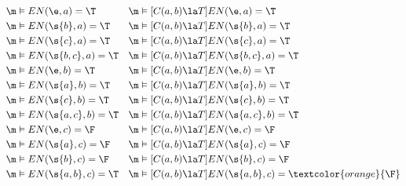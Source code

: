 \begin{frame}
    \begin{align*}
        \m & \vDash EN(\e,a)       = \T              &
        \m & \vDash[C(a,b)\la T] EN(\e,a)       = \T   \\
        \m & \vDash EN(\s{b},a)    = \T              &
        \m & \vDash[C(a,b)\la T] EN(\s{b},a)    = \T   \\
        \m & \vDash EN(\s{c},a)    = \T              &
        \m & \vDash[C(a,b)\la T] EN(\s{c},a)    = \T   \\
        \m & \vDash EN(\s{b,c},a)  = \T              &
        \m & \vDash[C(a,b)\la T] EN(\s{b,c},a)  = \T   \\
        \m & \vDash EN(\e,b)       = \T              &
        \m & \vDash[C(a,b)\la T] EN(\e,b)       = \T   \\
        \m & \vDash EN(\s{a},b)    = \T              &
        \m & \vDash[C(a,b)\la T] EN(\s{a},b)    = \T   \\
        \m & \vDash EN(\s{c},b)    = \T              &
        \m & \vDash[C(a,b)\la T] EN(\s{c},b)    = \T   \\
        \m & \vDash EN(\s{a,c},b)  = \T              &
        \m & \vDash[C(a,b)\la T] EN(\s{a,c},b)  = \T   \\
        \m & \vDash EN(\e,c)       = \F              &
        \m & \vDash[C(a,b)\la T] EN(\e,c)       = \F   \\
        \m & \vDash EN(\s{a},c)    = \F              &
        \m & \vDash[C(a,b)\la T] EN(\s{a},c)    = \F   \\
        \m & \vDash EN(\s{b},c)    = \F              &
        \m & \vDash[C(a,b)\la T] EN(\s{b},c)    = \F   \\
        \m & \vDash EN(\s{a,b},c)  = \T              &
        \m & \vDash[C(a,b)\la T] EN(\s{a,b},c)
        = \textcolor{orange}{\F}                      \\
    \end{align*}
\end{frame}

\begin{frame}
    \begin{center}
    \end{center}
\end{frame}